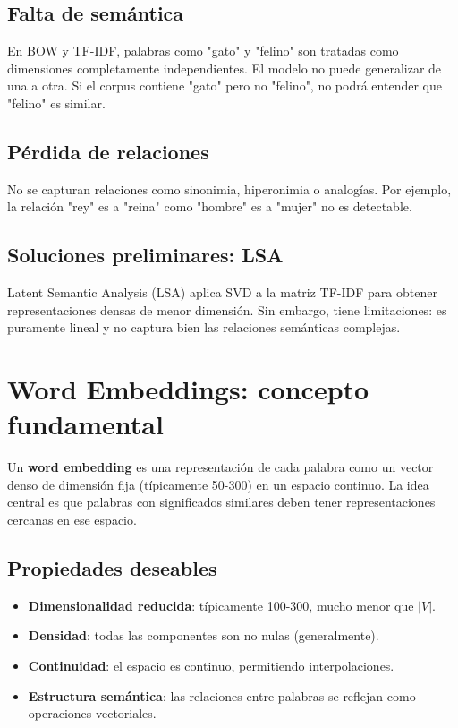 \documentclass[12pt,a4paper,openany,oneside]{book}
\begin{document}
\subsection{Falta de semántica}
En BOW y TF-IDF, palabras como "gato" y "felino" son tratadas como dimensiones completamente independientes. El modelo no puede generalizar de una a otra. Si el corpus contiene "gato" pero no "felino", no podrá entender que "felino" es similar.

\subsection{Pérdida de relaciones}
No se capturan relaciones como sinonimia, hiperonimia o analogías. Por ejemplo, la relación "rey" es a "reina" como "hombre" es a "mujer" no es detectable.

\subsection{Soluciones preliminares: LSA}
Latent Semantic Analysis (LSA) aplica SVD a la matriz TF-IDF para obtener representaciones densas de menor dimensión. Sin embargo, tiene limitaciones: es puramente lineal y no captura bien las relaciones semánticas complejas.

\section{Word Embeddings: concepto fundamental}

Un \textbf{word embedding} es una representación de cada palabra como un vector denso de dimensión fija (típicamente 50-300) en un espacio continuo. La idea central es que palabras con significados similares deben tener representaciones cercanas en ese espacio.

\subsection{Propiedades deseables}
\begin{itemize}
    \item \textbf{Dimensionalidad reducida}: típicamente 100-300, mucho menor que \(|V|\).
    \item \textbf{Densidad}: todas las componentes son no nulas (generalmente).
    \item \textbf{Continuidad}: el espacio es continuo, permitiendo interpolaciones.
    \item \textbf{Estructura semántica}: las relaciones entre palabras se reflejan como operaciones vectoriales.
\end{itemize}
\end{document}
